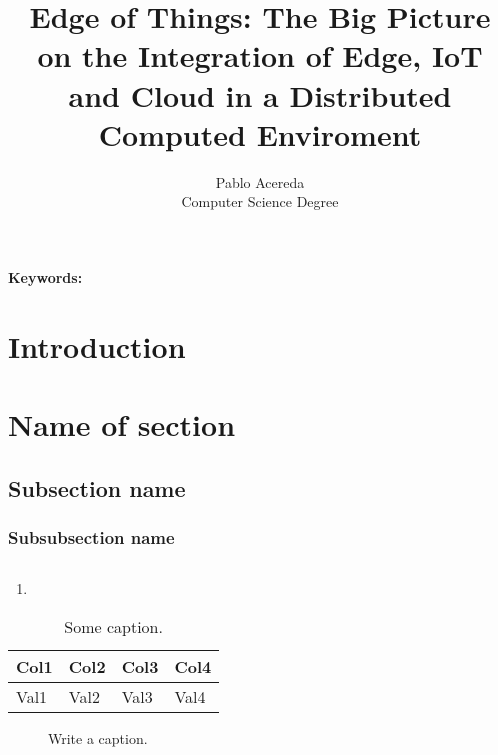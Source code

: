 \documentclass[10pt]{article}
\title{
    Edge of Things: The Big Picture on the Integration of Edge, IoT and Cloud in
    a Distributed Computed Enviroment
}
\author{
Pablo Acereda\\
Computer Science Degree\\
}
\begin{document}
\maketitle

\begin{abstract}


\end{abstract}

{\bf Keywords:}

\section{Introduction}

\section{Name of section}

\subsection{Subsection name}

\subsubsection{Subsubsection name}

\begin{equation}
\end{equation}


\begin{enumerate}
 \item 
\end{enumerate}

\begin{description}[align=left]
 \item [Item1] 
 \item [Item2]
\end{description}



\begin{table}[h!]
 \centering
  \begin{tabular}
        { | p{3cm} | p{3cm} | p{3cm} | p{3cm} | }
  \hline
  Col1 & Col2 & Col3 & Col4 \\
  \hline
  Val1 & Val2 & Val3 & Val4 \\
  \hline
  \end{tabular}
\caption{Some caption.}
\end{table}

\begin{figure}[h!]
 \centering
 \caption{Write a caption.
          \label{thisIsAReference}}
\end{figure}


\printbibliography
\end{document}
